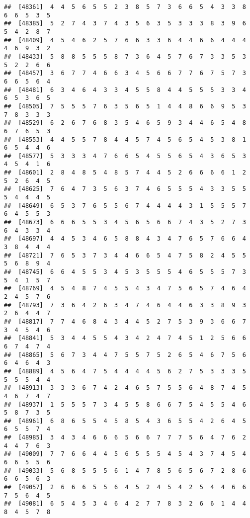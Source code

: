 \documentclass[
]{book}
\begin{document}
\begin{verbatim}
##  [48361]  4  4  5  6  5  5  2  3  8  5  7  3  6  6  5  4  3  3  8  6  6  5  3  5
##  [48385]  5  2  7  4  3  7  4  3  5  6  3  5  3  3  3  8  3  9  6  5  4  2  8  7
##  [48409]  4  5  4  6  2  5  7  6  6  3  3  6  4  4  6  6  4  4  4  4  6  9  3  2
##  [48433]  5  8  8  5  5  5  8  7  3  6  4  5  7  6  7  3  3  5  3  5  2  2  6  6
##  [48457]  3  6  7  7  4  6  6  3  4  5  6  6  7  7  6  7  5  7  3  6  6  5  6  4
##  [48481]  6  3  4  6  4  3  3  4  5  5  8  4  4  5  5  5  3  3  4  6  5  3  6  5
##  [48505]  7  5  5  5  7  6  3  5  6  5  1  4  4  8  6  6  9  5  3  7  8  3  3  3
##  [48529]  6  2  6  7  6  8  3  5  4  6  5  9  3  4  4  6  5  4  8  6  7  6  5  3
##  [48553]  4  4  5  5  7  8  4  4  5  7  4  5  6  5  4  5  3  8  1  6  5  4  4  6
##  [48577]  5  3  3  3  4  7  6  6  5  4  5  5  6  5  4  3  6  5  3  4  5  4  1  6
##  [48601]  2  8  4  8  5  4  8  5  7  4  4  5  2  6  6  6  6  1  2  5  2  6  4  5
##  [48625]  7  6  4  7  3  5  6  3  7  4  6  5  5  5  4  3  3  5  5  5  4  4  4  5
##  [48649]  6  5  3  7  6  5  5  6  7  4  4  4  4  3  1  5  5  5  7  6  4  5  5  3
##  [48673]  6  6  6  5  5  3  4  5  6  5  6  6  7  4  3  5  2  7  3  6  4  3  3  4
##  [48697]  4  4  5  3  4  6  5  8  8  4  3  4  7  6  5  7  6  6  4  3  8  4  4  4
##  [48721]  7  6  5  3  7  3  4  4  6  6  5  4  7  5  8  2  4  5  5  5  6  8  9  4
##  [48745]  6  6  4  5  5  3  4  5  3  5  5  5  4  6  5  5  5  7  3  5  4  1  5  7
##  [48769]  4  5  4  8  7  4  5  5  4  3  4  7  5  6  5  7  4  6  4  2  4  5  7  6
##  [48793]  7  3  6  4  2  6  3  4  7  4  6  4  4  6  3  3  8  9  3  2  6  4  4  7
##  [48817]  7  7  4  6  8  4  3  4  4  5  2  7  5  3  9  3  6  6  7  3  4  5  4  6
##  [48841]  5  3  4  4  5  5  4  3  4  2  4  7  4  5  1  2  5  6  6  6  7  4  7  4
##  [48865]  5  6  7  3  4  4  7  5  5  7  5  2  6  5  4  6  7  5  6  6  4  6  4  3
##  [48889]  4  5  6  4  7  5  4  4  4  4  5  6  2  7  5  3  3  3  5  5  5  5  4  4
##  [48913]  3  3  3  6  7  4  2  4  6  5  7  5  5  6  4  8  7  4  5  4  6  7  4  7
##  [48937]  1  5  5  5  7  3  4  5  5  8  6  6  7  5  4  5  5  4  6  5  8  7  3  5
##  [48961]  6  8  6  5  5  4  5  8  5  4  3  6  5  5  4  2  6  4  5  6  5  5  7  4
##  [48985]  3  4  3  4  6  6  6  5  6  6  7  7  7  5  6  4  7  6  2  4  4  7  6  3
##  [49009]  7  7  6  6  4  4  5  6  5  5  5  4  5  4  3  7  4  5  4  6  6  5  5  6
##  [49033]  5  6  8  5  5  5  6  1  4  7  8  5  6  5  6  7  2  8  6  6  6  5  6  3
##  [49057]  2  6  6  6  5  5  6  4  5  2  4  5  4  2  5  4  4  6  6  7  5  6  4  5
##  [49081]  6  5  4  5  3  4  6  4  2  7  7  8  3  2  6  6  1  4  4  8  4  5  7  8

\end{verbatim}
\end{document}
